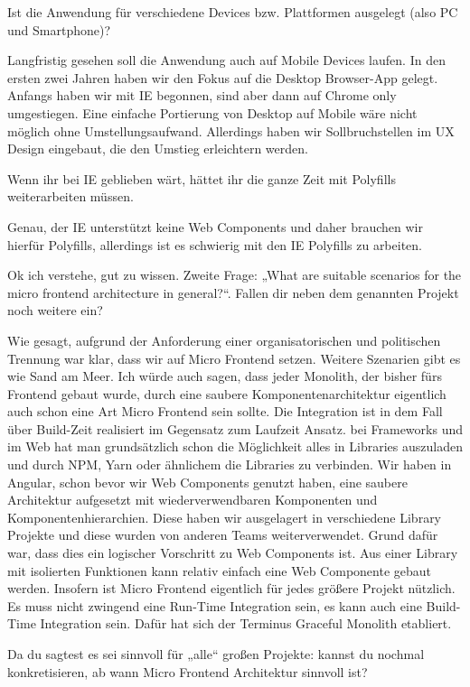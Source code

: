 \begin{description}
    \NicoVogel Ist die Anwendung für verschiedene Devices bzw. Plattformen ausgelegt (also PC und Smartphone)?

    \BerndOlleck Langfristig gesehen soll die Anwendung auch auf Mobile Devices laufen. In den ersten zwei Jahren haben wir den Fokus auf die Desktop Browser-App gelegt. Anfangs haben wir mit IE begonnen, sind aber dann auf Chrome only umgestiegen. Eine einfache Portierung von Desktop auf Mobile wäre nicht möglich ohne Umstellungsaufwand. Allerdings haben wir Sollbruchstellen im UX Design eingebaut, die den Umstieg erleichtern werden.

    \NicoVogel Wenn ihr bei IE geblieben wärt, hättet ihr die ganze Zeit mit Polyfills weiterarbeiten müssen.

    \BerndOlleck Genau, der IE unterstützt keine Web Components und daher brauchen wir hierfür Polyfills, allerdings ist es schwierig mit den IE Polyfills zu arbeiten.

    \NicoVogel Ok ich verstehe, gut zu wissen. Zweite Frage: „What are suitable scenarios for the micro frontend architecture in general?“. Fallen dir neben dem genannten Projekt noch weitere ein?

    \BerndOlleck Wie gesagt, aufgrund der Anforderung einer organisatorischen und politischen Trennung war klar, dass wir auf Micro Frontend setzen. Weitere Szenarien gibt es wie Sand am Meer. Ich würde auch sagen, dass jeder Monolith, der bisher fürs Frontend gebaut wurde, durch eine saubere Komponentenarchitektur eigentlich auch schon eine Art Micro Frontend sein sollte. Die Integration ist in dem Fall über Build-Zeit realisiert im Gegensatz zum Laufzeit Ansatz. bei Frameworks und im Web hat man grundsätzlich schon die Möglichkeit alles in Libraries auszuladen und durch NPM, Yarn oder ähnlichem die Libraries zu verbinden. Wir haben in Angular, schon bevor wir Web Components genutzt haben, eine saubere Architektur aufgesetzt mit wiederverwendbaren Komponenten und Komponentenhierarchien. Diese haben wir ausgelagert in verschiedene Library Projekte und diese wurden von anderen Teams weiterverwendet. Grund dafür war, dass dies ein logischer Vorschritt zu Web Components ist. Aus einer Library mit isolierten Funktionen kann relativ einfach eine Web Componente gebaut werden. Insofern ist Micro Frontend eigentlich für jedes größere Projekt nützlich. Es muss nicht zwingend eine Run-Time Integration sein, es kann auch eine Build-Time Integration sein. Dafür hat sich der Terminus Graceful Monolith etabliert.

    \NicoVogel Da du sagtest es sei sinnvoll für „alle“ großen Projekte: kannst du nochmal konkretisieren, ab wann Micro Frontend Architektur sinnvoll ist?


\end{description}

